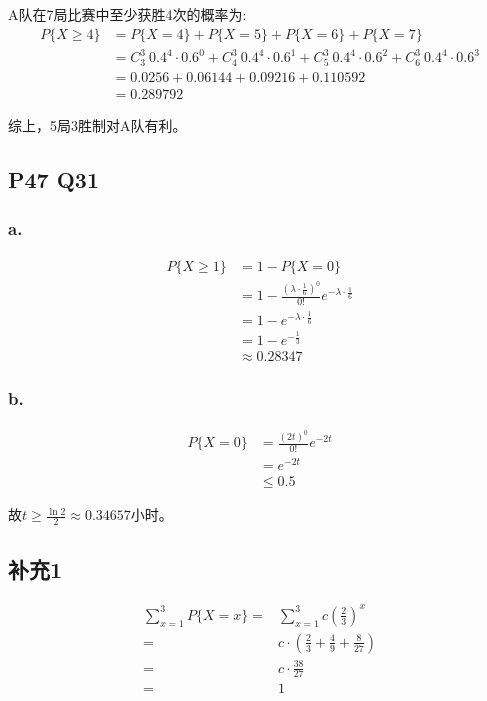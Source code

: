 \documentclass[a4paper,12pt]{ctexart}
\begin{document}
A队在7局比赛中至少获胜4次的概率为:
\begin{align*}
	P\{X \geq 4\} &= P\{X = 4\} + P\{X = 5\} + P\{X = 6\} + P\{X = 7\} \\
	&= C_3^3\ 0.4^4 \cdot 0.6^0 + C_4^3\ 0.4^4 \cdot 0.6^1 + C_5^3\ 0.4^4 \cdot 0.6^2 + C_6^3\ 0.4^4 \cdot 0.6^3 \\
	&= 0.0256 + 0.06144 + 0.09216 + 0.110592 \\
	&= 0.289792
\end{align*}

综上，5局3胜制对A队有利。

\subsection*{P47 Q31}

\subsubsection*{a.}

\begin{align*}
	P\{X \geq 1\} &= 1 - P\{X = 0\} \\
	&= 1 - \frac{(\lambda \cdot \frac{1}{6})^0}{0!} e^{-\lambda \cdot \frac{1}{6}} \\
	&= 1 - e^{-\lambda \cdot \frac{1}{6}}\\
	&= 1 - e^{-\frac{1}{3}}\\
	&\approx 0.28347
\end{align*}

\subsubsection*{b.}

\begin{align*}
	P\{X = 0\} &=\frac{(2t)^0}{0!} e^{-2t}\\
	&= e^{-2t}\\
	&\leq 0.5
\end{align*}

故$t \geq \frac{\ln 2}{2} \approx 0.34657$小时。

\subsection*{补充1}
\begin{align*}
	\sum_{x = 1}^{3} P\{X = x\} =& \sum_{x = 1}^{3} c(\frac{2}{3})^x\\
	=& c \cdot (\frac{2}{3} + \frac{4}{9} + \frac{8}{27})\\
	=& c \cdot \frac{38}{27}\\
	=& 1
\end{align*}
\end{document}
